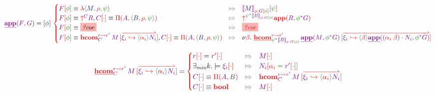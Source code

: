 \documentclass{article}
\newcommand\Eval[2]{
  \FmtFam{
    {\left\llbracket\FmtTm{#1}\right\rrbracket}_{\FmtVal{#2}}
  }
}
\begin{document}
\[
  \SemApp{F}{G}
  =
  \Fam{\phi}{
    \begin{cases}
      \Cond{
        \FamTest{F}{\phi}
        \equiv
        \VLam{
          \VClo{M}{\rho}{\psi}
        }
      }{
        \FamTest{
          \Eval{M}{\rho, \FamTest{G}{\phi}}
        }{
          \psi
        }
      }
      \\
      \Cond{
        \FamTest{F}{\phi}
        \equiv
        \VUp{C}{R},
        \FamTest{C}{\RstId}\equiv \VPi{A}{\VClo{B}{\rho}{\psi}}
      }{
        \VUp{
          \Rst{\psi}{\Eval{B}{\rho,\FamTest{G}{\phi}}}
        }{
          \VApp{R}{
            \Rst{\phi}{G}
          }
        }
      }
      \\
      \Cond{
        \FamTest{F}{\phi}
        \equiv
        \Hole{coe}
      }{
        \Hole{coe}
      }
      \\
      \Cond{
        \FamTest{F}{\phi}
        \equiv
        \VHCom{r}{r'}{C}{M}{
          \Vec{
            \VFace{\xi_i}{
              \VAbs{\alpha_i}{N_i}
            }
          }
        },
        \FamTest{C}{\RstId}\equiv
        \VPi{A}{\VClo{B}{\rho}{\psi}}
      }{
        \Fresh{\beta}{
          \SemHCom{r}{r'}{
            \Rst{\psi}{\Eval{B}{\rho,\FamTest{G}{\phi}}}
          }{
            \SemApp{M}{\Rst{\phi}{G}}
          }{
            \Vec{
              \VFace{\xi_i}{
                \VAbs{\beta}{
                  \SemApp{
                    \Act{
                      \Swap{\alpha_i}{\beta}
                    }{N_i}
                  }{
                    \Rst{\phi}{G}
                  }
                }
              }
            }
          }
        }
      }
    \end{cases}
  }
\]

\[
  \SemHCom{r}{r'}{C}{M}{
    \Vec{
      \VFace{\xi_i}{\VAbs{\alpha_i}{N_i}}
    }
  }
  =
  \FmtVal{
    \begin{cases}
      \Cond{
        \FamTest{r}{\RstId}=\FamTest{r'}{\RstId}
      }{
        \FamTest{M}{\RstId}
      }
      \\
      \Cond{
        \exists_{\textit{min}}k.\models\FamTest{\xi_i}{\RstId}
      }{
        \FamTest{N_i}{
          \RstEquate{\alpha_i}{\FamTest{r'}{\RstId}}
        }
      }
      \\
      \Cond{
        \FamTest{C}{\RstId}
        \equiv
        \VPi{A}{B}
      }{
        \VHCom{r}{r'}{C}{M}{
          \Vec{
            \VFace{\xi_i}{\VAbs{\alpha_i}{N_i}}
          }
        }
      }
      \\
      \Cond{
        \FamTest{C}{\RstId}\equiv\VBool
      }{
        \FamTest{M}{\RstId}
      }
    \end{cases}
  }
\]
\end{document}
